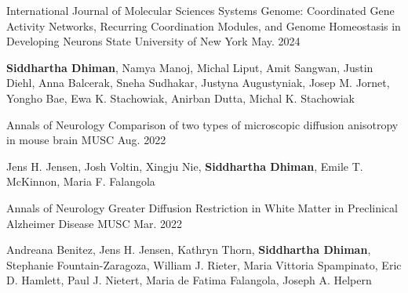 

\begin{cventries}
  \cventry
    {International Journal of Molecular Sciences} %
    {Systems Genome: Coordinated Gene Activity Networks, Recurring Coordination Modules, and Genome Homeostasis in Developing Neurons} %
    {State University of New York} %
    {May. 2024} %
    {
      \begin{cvitems} %
        \item {\textbf{Siddhartha Dhiman}, Namya Manoj, Michal Liput, Amit Sangwan, Justin Diehl, Anna Balcerak, Sneha Sudhakar, Justyna Augustyniak, Josep M. Jornet, Yongho Bae, Ewa K. Stachowiak, Anirban Dutta, Michal K. Stachowiak}
      \end{cvitems}
    }

  \cventry
    {Annals of Neurology} %
    {Comparison of two types of microscopic diffusion anisotropy in mouse brain} %
    {MUSC} %
    {Aug. 2022} %
    {
      \begin{cvitems} %
        \item {Jens H. Jensen, Josh Voltin, Xingju Nie, \textbf{Siddhartha Dhiman}, Emile T. McKinnon, Maria F. Falangola}
      \end{cvitems}
    }

  \cventry
    {Annals of Neurology} %
    {Greater Diffusion Restriction in White Matter in Preclinical Alzheimer Disease} %
    {MUSC} %
    {Mar. 2022} %
    {
      \begin{cvitems} %
        \item {Andreana Benitez, Jens H. Jensen, Kathryn Thorn, \textbf{Siddhartha Dhiman}, Stephanie Fountain-Zaragoza, William J. Rieter, Maria Vittoria Spampinato, Eric D. Hamlett, Paul J. Nietert, Maria de Fatima Falangola, Joseph A. Helpern}
      \end{cvitems}
    }


\end{cventries}
